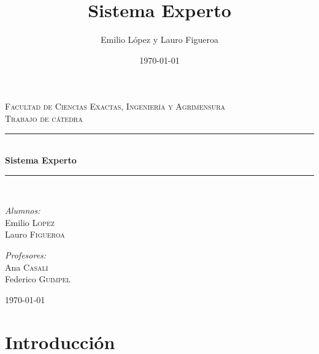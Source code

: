 \documentclass[11pt,oneside,a4paper]{article}
\title{Sistema Experto}
\author{Emilio López y Lauro Figueroa}
\date{\today}
\newcommand{\HRule}{\rule{\linewidth}{0.5mm}}
\begin{document}
 
\begin{titlepage}
\begin{center}


\textsc{\LARGE Facultad de Ciencias Exactas, Ingeniería y Agrimensura}\\[1.5cm]
	
\textsc{\Large Trabajo de cátedra}\\[0.5cm]

\HRule \\[0.4cm]
{ \huge \bfseries Sistema Experto \\[0.4cm] }

\HRule \\[1.5cm]

\noindent
\begin{minipage}{0.4\textwidth}
\begin{flushleft} \large
\emph{Alumnos:}\\
Emilio \textsc{Lopez}\\
Lauro \textsc{Figueroa}
\end{flushleft}
\end{minipage}%
\begin{minipage}{0.4\textwidth}
\begin{flushright} \large
\emph{Profesores:} \\
Ana \textsc{Casali}\\
Federico \textsc{Guimpel}\\
\end{flushright}
\end{minipage}

\vfill

{\large \today}

\end{center}
\end{titlepage}

\newpage 

\section*{Introducción}
\end{document}
